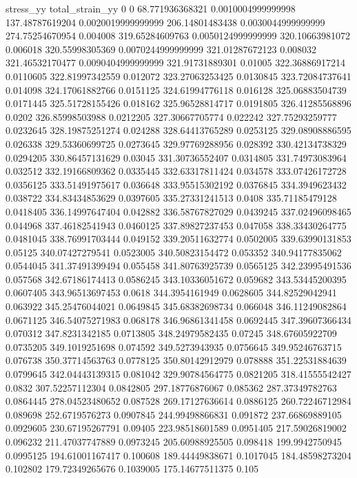 stress_yy total_strain_yy
0 0
68.771936368321 0.0010004999999998
137.48787619204 0.0020019999999999
206.14801483438 0.0030044999999999
274.75254670954 0.004008
319.65284609763 0.0050124999999999
320.10663981072 0.006018
320.55998305369 0.0070244999999999
321.01287672123 0.008032
321.46532170477 0.0090404999999999
321.91731889301 0.01005
322.36886917214 0.0110605
322.81997342559 0.012072
323.27063253425 0.0130845
323.72084737641 0.014098
324.17061882766 0.0151125
324.61994776118 0.016128
325.06883504739 0.0171445
325.51728155426 0.018162
325.96528814717 0.0191805
326.41285568896 0.0202
326.85998503988 0.0212205
327.30667705774 0.022242
327.75293259777 0.0232645
328.19875251274 0.024288
328.64413765289 0.0253125
329.08908886595 0.026338
329.53360699725 0.0273645
329.97769288956 0.028392
330.42134738329 0.0294205
330.86457131629 0.03045
331.30736552407 0.0314805
331.74973083964 0.032512
332.19166809362 0.0335445
332.63317811424 0.034578
333.07426172728 0.0356125
333.51491975617 0.036648
333.95515302192 0.0376845
334.3949623432 0.038722
334.83434853629 0.0397605
335.27331241513 0.0408
335.71185479128 0.0418405
336.14997647404 0.042882
336.58767827029 0.0439245
337.02496098465 0.044968
337.46182541943 0.0460125
337.89827237453 0.047058
338.33430264775 0.0481045
338.76991703444 0.049152
339.20511632774 0.0502005
339.63990131853 0.05125
340.07427279541 0.0523005
340.50823154472 0.053352
340.94177835062 0.0544045
341.37491399494 0.055458
341.80763925739 0.0565125
342.23995491536 0.057568
342.67186174413 0.0586245
343.10336051672 0.059682
343.53445200395 0.0607405
343.96513697453 0.0618
344.3954161949 0.0628605
344.82529042941 0.063922
345.25476044021 0.0649845
345.68382698734 0.066048
346.11249082864 0.0671125
346.54075271983 0.068178
346.96861341458 0.0692445
347.39607366434 0.070312
347.8231342185 0.0713805
348.24979582435 0.07245
348.67605922709 0.0735205
349.1019251698 0.074592
349.5273943935 0.0756645
349.95246763715 0.076738
350.37714563763 0.0778125
350.80142912979 0.078888
351.22531884639 0.0799645
342.04443139315 0.081042
329.90784564775 0.0821205
318.41555542427 0.0832
307.52257112304 0.0842805
297.18776876067 0.085362
287.37349782763 0.0864445
278.04523480652 0.087528
269.17127636614 0.0886125
260.72246712984 0.089698
252.6719576273 0.0907845
244.99498866831 0.091872
237.66869889105 0.0929605
230.67195267791 0.09405
223.98518601589 0.0951405
217.59026819002 0.096232
211.47037747889 0.0973245
205.60988925505 0.098418
199.9942750945 0.0995125
194.61001167417 0.100608
189.44449838671 0.1017045
184.48598273204 0.102802
179.72349265676 0.1039005
175.14677511375 0.105
